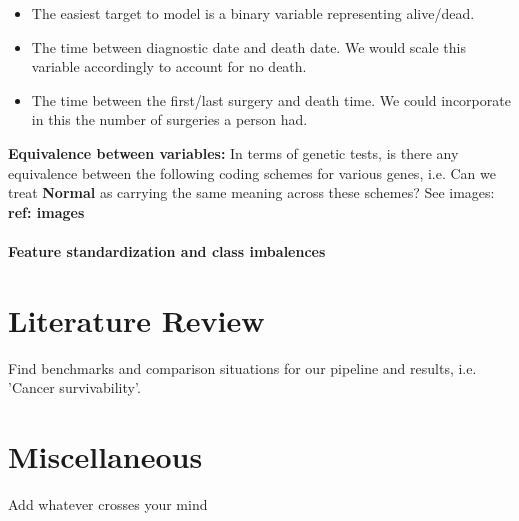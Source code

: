 \documentclass[a4paper]{article}
\begin{document}
\begin{itemize}
\item The easiest target to model is a binary variable representing alive/dead.
\item The time between diagnostic date and death date. We would scale this variable accordingly to account for no death. 
\item The time between the first/last surgery and death time. We could incorporate in this the number of surgeries a person had. 
\end{itemize}
%
\textbf{Equivalence between variables:}
In terms of genetic tests, is there any equivalence between the following coding schemes for various genes, i.e. Can we treat \textbf{Normal} as carrying the same meaning across these schemes? See images:\\
\textbf{ref: images}\\
\\
\textbf{Feature standardization and class imbalences}


\section{Literature Review}
Find benchmarks and comparison situations for our pipeline and results, i.e. 'Cancer survivability'.

\section{Miscellaneous}
Add whatever crosses your mind
\end{document}
